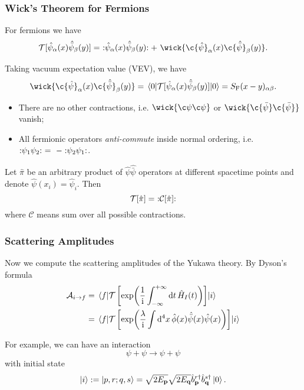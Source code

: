 \documentclass[a4paper,11pt]{article}
\begin{document}
	\subsubsection{Wick's Theorem for Fermions}

	For fermions we have 
	\[
		\mathcal{T}[\hat \psi_\alpha(x)\hat{\bar \psi}_\beta(y)] =\ \nord{\hat \psi_\alpha(x)\hat{\bar \psi}_\beta(y)} +\ \wick{\c{\hat \psi}_\alpha(x) \c{\hat{\bar \psi}}_\beta(y)}.
	\]
	
	Taking vacuum expectation value (VEV), we have
	\[
		\wick{\c{\hat \psi}_\alpha(x) \c{\hat{\bar \psi}}_\beta(y)} = \mel{0}{\mathcal{T}[\hat \psi_\alpha(x)\hat{\bar \psi}_\beta(y)]}{0} = S _{\text{F}}(x-y)_{\alpha \beta}.
	\]
	\begin{itemize}
		\item There are no other contractions, i.e. $\wick{\c \psi \c \psi}$ or $\wick{\c {\bar \psi} \c {\bar \psi}}$ vanish;
		\item All fermionic operators \emph{anti-commute} inside normal ordering, i.e.\ $:\mathrel{\psi_1 \psi_2}:\ =\ - :\mathrel{\psi_2 \psi_1}:$.
	\end{itemize} 
	
	\begin{thm}
		Let $\hat \pi$ be an arbitrary product of $\hat \psi \hat{\bar \psi}$ operators at different spacetime points and denote $\hat \psi(x_i) = \hat \psi_i$. Then
		\[
			\mathcal T[\hat \pi] =\ \nord{\mathcal{C}[\hat \pi]}
		\]
		where $\mathcal{C}$ means sum over all possible contractions.
	\end{thm}

	\subsubsection{Scattering Amplitudes} 
	Now we compute the scattering amplitudes of the Yukawa theory. By Dyson's formula
	\begin{align*}
		\mathcal{A}_{i \to f} &= \mel{f}{\mathcal{T}\left[ \exp(\frac{1}{\mathrm{i}}\int_{-\infty}^{+\infty}\dd{t} \hat H_I(t)) \right]}{i}\\
		& = \mel{f}{\mathcal{T}\left[ \exp(\frac{\lambda}{\mathrm{i}}\int \dd[4]{x} \hat \phi(x)\hat{\bar \psi}(x)\hat \psi(x)) \right]}{i}
	\end{align*}

	For example, we can have an interaction
	\[
		\psi + \psi \to \psi + \psi
	\]
	with initial state
	\[
		\ket{i} : = \ket{p, r ; q, s} = \sqrt{2 E _{\vb p}} \sqrt{2 E _{\vb q}} \hat b^{r\dagger}_{\vb p} \hat b^{s\dagger}_{\vb q} \ket{0}.
	\]
\end{document}
